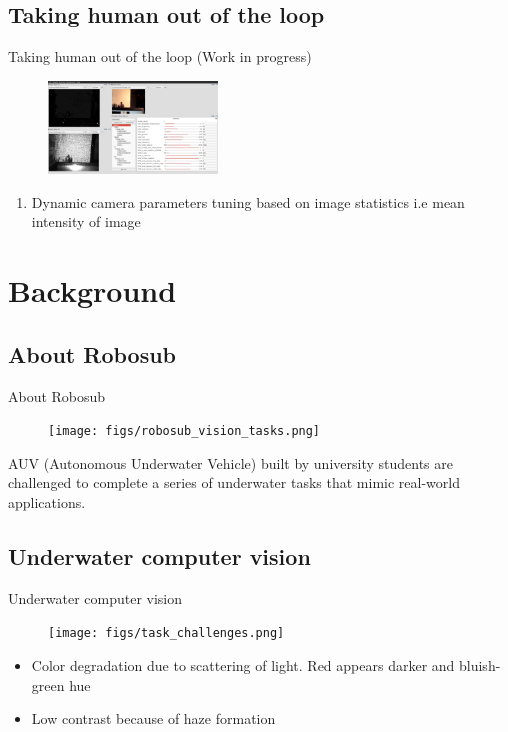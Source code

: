 \documentclass{beamer}
\begin{document}
\subsection{Taking human out of the loop}
\begin{frame}{Taking human out of the loop (Work in progress)}
    \begin{figure}[ht]
        \centering
        \includegraphics[width=0.4\textwidth, height=0.4\textheight]{figs/dynamic_reconf.png}
    \end{figure}
    \begin{enumerate}
        \item Dynamic camera parameters tuning based on image statistics i.e mean intensity of image
    \end{enumerate}
\end{frame}



\section{Background}

\subsection{About Robosub}
\begin{frame}{About Robosub}
    \begin{figure}[ht]
        \centering
        \texttt{[image: figs/robosub\_vision\_tasks.png]}
    \end{figure}
    AUV (Autonomous Underwater Vehicle) built by university students are challenged to complete a series of underwater tasks that mimic real-world applications.
\end{frame}

\subsection{Underwater computer vision}
\begin{frame}{Underwater computer vision}
    \begin{figure}[ht]
        \centering
        \texttt{[image: figs/task\_challenges.png]}
    \end{figure}
    \begin{itemize}
        \item Color degradation due to scattering of light. Red appears darker and bluish-green hue
        \item Low contrast because of haze formation
    \end{itemize}
\end{frame}
\end{document}
